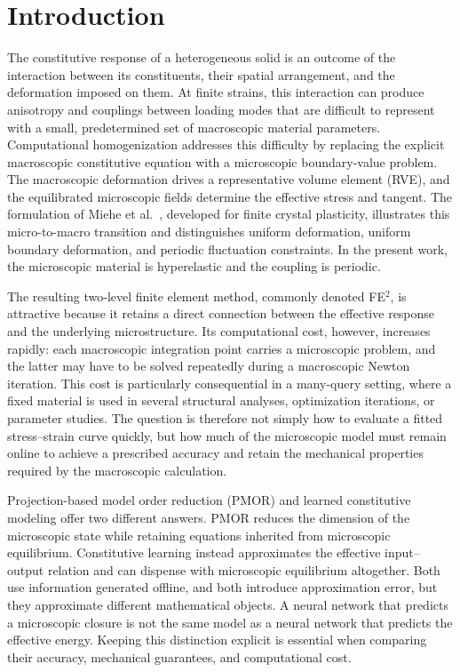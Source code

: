\section{Introduction}
\label{sec:intro}
The constitutive response of a heterogeneous solid is an outcome of the interaction between its constituents, their spatial arrangement, and the deformation imposed on them. At finite strains, this interaction can produce anisotropy and couplings between loading modes that are difficult to represent with a small, predetermined set of macroscopic material parameters. Computational homogenization addresses this difficulty by replacing the explicit macroscopic constitutive equation with a microscopic boundary-value problem. The macroscopic deformation drives a representative volume element (RVE), and the equilibrated microscopic fields determine the effective stress and tangent. The formulation of Miehe et al.~\cite{Miehe1999}, developed for finite crystal plasticity, illustrates this micro-to-macro transition and distinguishes uniform deformation, uniform boundary deformation, and periodic fluctuation constraints. In the present work, the microscopic material is hyperelastic and the coupling is periodic.

The resulting two-level finite element method, commonly denoted FE$^2$, is attractive because it retains a direct connection between the effective response and the underlying microstructure. Its computational cost, however, increases rapidly: each macroscopic integration point carries a microscopic problem, and the latter may have to be solved repeatedly during a macroscopic Newton iteration. This cost is particularly consequential in a many-query setting, where a fixed material is used in several structural analyses, optimization iterations, or parameter studies. The question is therefore not simply how to evaluate a fitted stress--strain curve quickly, but how much of the microscopic model must remain online to achieve a prescribed accuracy and retain the mechanical properties required by the macroscopic calculation.

Projection-based model order reduction (PMOR) and learned constitutive modeling offer two different answers. PMOR reduces the dimension of the microscopic state while retaining equations inherited from microscopic equilibrium. Constitutive learning instead approximates the effective input--output relation and can dispense with microscopic equilibrium altogether. Both use information generated offline, and both introduce approximation error, but they approximate different mathematical objects. A neural network that predicts a microscopic closure is not the same model as a neural network that predicts the effective energy. Keeping this distinction explicit is essential when comparing their accuracy, mechanical guarantees, and computational cost.

